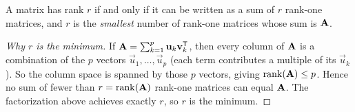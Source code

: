 \begin{theorem}\label{ch16:sum-rank-one}
A matrix has rank $r$ if and only if it can be written as a sum of $r$ rank-one
matrices, and $r$ is the \emph{smallest} number of rank-one matrices whose sum is
$\mathbf{A}$.
\end{theorem}

\begin{proof}[Why $r$ is the minimum]
If $\mathbf{A}=\sum_{k=1}^{p}\mathbf{u}_k\mathbf{v}_k^{\mathsf{T}}$, then every column of $\mathbf{A}$ is
a combination of the $p$ vectors $\vec{u}_1,\dots,\vec{u}_p$ (each term
contributes a multiple of its $\vec{u}_k$). So the column space is spanned by
those $p$ vectors, giving $\operatorname{rank}(\mathbf{A})\le p$. Hence no sum of fewer than
$r=\operatorname{rank}(\mathbf{A})$ rank-one matrices can equal $\mathbf{A}$. The factorization above
achieves exactly $r$, so $r$ is the minimum.
\end{proof}


